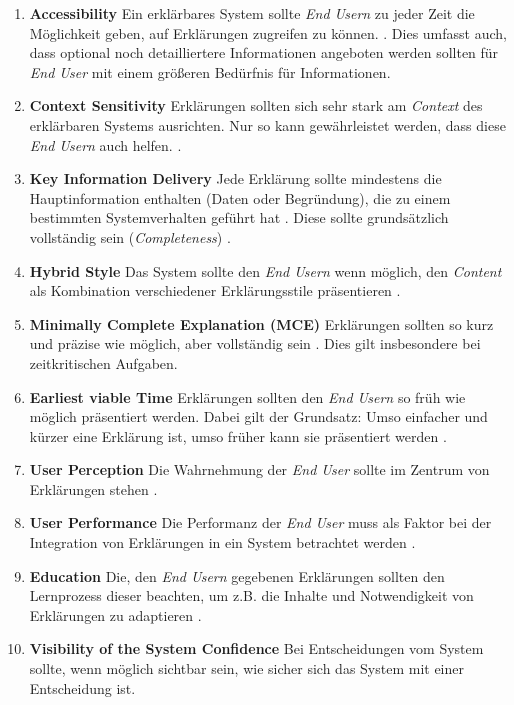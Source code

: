\begin{enumerate}
    \item \textbf{Accessibility} Ein erklärbares System sollte \textit{End Usern} zu jeder Zeit die Möglichkeit geben, auf Erklärungen zugreifen zu können. \cite{wiegand2019drive, chazette_end-users_nodate, wiegand_id_2020, weitz_you_2019}. Dies umfasst auch, dass optional noch detailliertere Informationen angeboten werden sollten für \textit{End User} mit einem größeren Bedürfnis für Informationen. \cite{martin_evaluating_2021}
    \item \textbf{Context Sensitivity} Erklärungen sollten sich sehr stark am \textit{Context} des erklärbaren Systems ausrichten. Nur so kann gewährleistet werden, dass diese \textit{End Usern} auch helfen. \cite{sato_context_nodate, rjoob_towards_2021,chazette_end-users_nodate}.
    \item \textbf{Key Information Delivery} Jede Erklärung sollte mindestens die Hauptinformation enthalten (Daten oder Begründung), die zu einem bestimmten Systemverhalten geführt hat \cite{martin_evaluating_2021}. Diese sollte grundsätzlich vollständig sein (\textit{Completeness}) \cite{riveiro_thats_2021}.
    \item \textbf{Hybrid Style} Das System sollte den \textit{End Usern} wenn möglich, den \textit{Content} als Kombination verschiedener Erklärungsstile präsentieren \cite{sato_action-triggering_2019, kunkel_let_2019, sato_action-triggering_2019, schrills_color_2020, lim_2009_assessing}.
    \item \textbf{Minimally Complete Explanation (MCE)} \cite[vgl.][]{zahedi_towards_2019} Erklärungen sollten so kurz und präzise wie möglich, aber vollständig sein \cite{wiegand_id_2020, wiegand2019drive, zahedi_towards_2019}. Dies gilt insbesondere bei zeitkritischen Aufgaben.
    \item \textbf{Earliest viable Time} Erklärungen sollten den \textit{End Usern} so früh wie möglich präsentiert werden. Dabei gilt der Grundsatz: Umso einfacher und kürzer eine Erklärung ist, umso früher kann sie präsentiert werden \cite{hleg2019policy, sovrano_modelling_2020}.
    \item \textbf{User Perception} Die Wahrnehmung der \textit{End User} sollte im Zentrum von Erklärungen stehen \cite{riveiro_thats_2021}.
    \item \textbf{User Performance} Die Performanz der \textit{End User} muss als Faktor bei der Integration von Erklärungen in ein System betrachtet werden \cite{riveiro_thats_2021}.
    \item \textbf{Education} Die, den \textit{End Usern} gegebenen Erklärungen sollten den Lernprozess dieser beachten, um z.B. die Inhalte und Notwendigkeit von Erklärungen zu adaptieren \cite{wang_integration_2020}.
    \item \textbf{Visibility of the System Confidence} Bei Entscheidungen vom System sollte, wenn möglich sichtbar sein, wie sicher sich das System mit einer Entscheidung ist. \cite{wiegand_id_2020, golledge1999wayfinding}
\end{enumerate}

